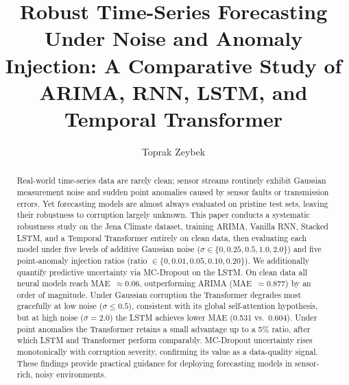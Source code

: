 \documentclass[runningheads]{llncs}
\begin{document}
\title{Robust Time-Series Forecasting Under Noise and Anomaly Injection: A Comparative Study of ARIMA, RNN, LSTM, and Temporal Transformer}


\author{Toprak Zeybek}



\maketitle

\begin{abstract}
Real-world time-series data are rarely clean; sensor streams routinely exhibit Gaussian measurement noise and sudden point anomalies caused by sensor faults or transmission errors. Yet forecasting models are almost always evaluated on pristine test sets, leaving their robustness to corruption largely unknown. This paper conducts a systematic robustness study on the Jena Climate dataset, training ARIMA, Vanilla RNN, Stacked LSTM, and a Temporal Transformer entirely on clean data, then evaluating each model under five levels of additive Gaussian noise ($\sigma \in \{0, 0.25, 0.5, 1.0, 2.0\}$) and five point-anomaly injection ratios (ratio $\in \{0, 0.01, 0.05, 0.10, 0.20\}$). We additionally quantify predictive uncertainty via MC-Dropout on the LSTM. On clean data all neural models reach MAE~$\approx 0.06$, outperforming ARIMA (MAE~$= 0.877$) by an order of magnitude. Under Gaussian corruption the Transformer degrades most gracefully at low noise ($\sigma \leq 0.5$), consistent with its global self-attention hypothesis, but at high noise ($\sigma = 2.0$) the LSTM achieves lower MAE (0.531 vs.\ 0.604). Under point anomalies the Transformer retains a small advantage up to a 5\% ratio, after which LSTM and Transformer perform comparably. MC-Dropout uncertainty rises monotonically with corruption severity, confirming its value as a data-quality signal. These findings provide practical guidance for deploying forecasting models in sensor-rich, noisy environments.

\end{abstract}
\end{document}
